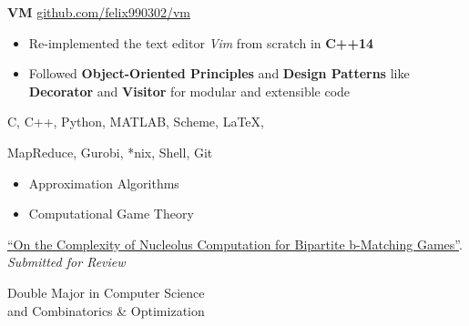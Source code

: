 \documentclass[11pt,a4paper]{altacv}
\begin{document}
\begin{paracol}{2}
\iffalse
\cvevent{Pleter}{}{May 2019}{\href{https://github.com/felix990302/word\_completion}{github.com/felix990302/word\_completion}}
\begin{itemize}
    \item Designed a concurrent auto-completion engine using a variation of \textbf{range trees} consisting of a \textbf{compressed trie} and sorted arrays in \textbf{C++}
    \item Accounted for race conditions and deadlocks using fine-grained read-write lock hierarchies
    \item Incorporated \textbf{gprof} as profiler for optimizations including a static \textbf{fixed-size allocator} to achieve \textbf{20x} speedup
\end{itemize}

\divider
\fi
\textbf{VM}
\hfill\href{https://github.com/felix990302/vm}{\faExternalLink* github.com/felix990302/vm}
\smallskip
\begin{itemize}
    \item Re-implemented the text editor \emph{Vim} from scratch in \textbf{C++14}
    \item Followed \textbf{Object-Oriented Principles} and \textbf{Design Patterns} like \textbf{Decorator} and \textbf{Visitor} for modular and extensible code
\end{itemize}

\switchcolumn

C, C++, Python, MATLAB, Scheme, \LaTeX,

\smallskip

MapReduce, Gurobi, *nix, Shell, Git

\begin{itemize}
  \item Approximation Algorithms
  \item Computational Game Theory
\end{itemize}

\href{https://arxiv.org/abs/2105.07161}{\faExternalLink* ``On the Complexity of Nucleolus Computation for Bipartite b-Matching Games''}.
\emph{Submitted for Review}


Double Major in Computer Science\\
and Combinatorics \& Optimization


\end{paracol}
\end{document}
